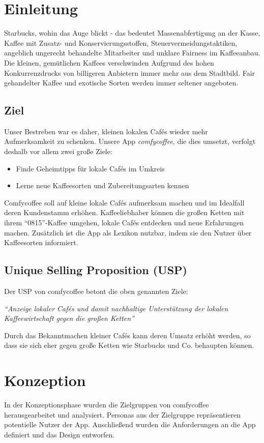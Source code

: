 \chapter{Einleitung}
\label{einleitung}
Starbucks, wohin das Auge blickt - das bedeutet Massenabfertigung an der Kasse, Kaffee mit Zusatz- und Konservierungsstoffen, Steuervermeidungstaktiken, angeblich ungerecht behandelte Mitarbeiter und unklare Fairness im Kaffeeanbau. Die kleinen, gemütlichen Kaffees verschwinden Aufgrund des hohen Konkurrenzdrucks von billigeren Anbietern immer mehr aus dem Stadtbild. Fair gehandelter Kaffee und exotische Sorten werden immer seltener angeboten.

\section{Ziel}
Unser Bestreben war es daher, kleinen lokalen Cafés wieder mehr Aufmerksamkeit zu schenken. Unsere App \emph{comfycoffee}, die dies umsetzt, verfolgt deshalb vor allem zwei große Ziele:
\begin{itemize}
	\item Finde Geheimtipps für lokale Cafés im Umkreis
	\item Lerne neue Kaffeesorten und Zubereitungsarten kennen
\end{itemize}
Comfycoffee soll auf kleine lokale Cafés aufmerksam machen und im Idealfall deren Kundenstamm erhöhen. Kaffeeliebhaber können die großen Ketten mit ihrem ``0815''-Kaffee umgehen, lokale Cafés entdecken und neue Erfahrungen machen. Zusätzlich ist die App als Lexikon nutzbar, indem sie den Nutzer über Kaffeesorten informiert.

\section{Unique Selling Proposition (USP)}
Der USP von comfycoffee betont die oben genannten Ziele:

\begin{center}
\emph{``Anzeige lokaler Cafés und damit nachhaltige Unterstützung der lokalen Kaffeewirtschaft gegen die großen Ketten''}
\end{center}

Durch das Bekanntmachen kleiner Cafés kann deren Umsatz erhöht werden, so dass sie sich eher gegen große Ketten wie Starbucks und Co. behaupten können.

\chapter{Konzeption}
\label{konzeption}
In der Konzeptionsphase wurden die Zielgruppen von comfycoffee herausgearbeitet und analysiert. Personas aus der Zielgruppe repräsentieren potentielle Nutzer der App. Anschließend wurden die Anforderungen an die App definiert und das Design entworfen.

